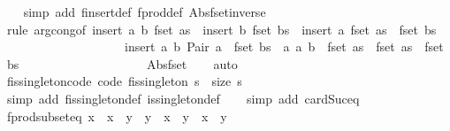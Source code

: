 \begin{isabellebody}
%
\isadelimproof
\ \ %
\endisadelimproof
%
\isatagproof
{}\isamarkupfalse%
\ {\isacharparenleft}simp\ add{\isacharcolon}\ finsert{\isacharunderscore}def\ fprod{\isacharunderscore}def\ Abs{\isacharunderscore}fset{\isacharunderscore}inverse{\isacharparenright}\isanewline
\ \ \isamarkupfalse%
\ {\isacharparenleft}rule\ arg{\isacharunderscore}cong{\isacharbrackleft}of\ {\isachardoublequoteopen}{\isacharparenleft}insert\ {\isacharparenleft}a{\isacharcomma}\ b{\isacharparenright}\ {\isacharparenleft}fset\ as\ {\isasymtimes}\ insert\ b\ {\isacharparenleft}fset\ bs{\isacharparenright}\ {\isasymunion}\ insert\ a\ {\isacharparenleft}fset\ as{\isacharparenright}\ {\isasymtimes}\ fset\ bs{\isacharparenright}{\isacharparenright}{\isachardoublequoteclose}\isanewline
\ \ \ \ \ \ \ \ \ \ \ \ \ \ \ \ \ \ \ \ {\isachardoublequoteopen}{\isacharparenleft}insert\ {\isacharparenleft}a{\isacharcomma}\ b{\isacharparenright}\ {\isacharparenleft}Pair\ a\ {\isacharbackquote}\ fset\ bs\ {\isasymunion}\ {\isacharparenleft}{\isasymlambda}a{\isachardot}\ {\isacharparenleft}a{\isacharcomma}\ b{\isacharparenright}{\isacharparenright}\ {\isacharbackquote}\ fset\ as\ {\isasymunion}\ fset\ as\ {\isasymtimes}\ fset\ bs{\isacharparenright}{\isacharparenright}{\isachardoublequoteclose}\isanewline
\ \ \ \ \ \ \ \ \ \ \ \ \ \ \ \ \ \ \ \ Abs{\isacharunderscore}fset{\isacharbrackright}{\isacharparenright}\isanewline
\ \ \isamarkupfalse%
\ auto%
\endisatagproof
{\isafoldproof}%
%
\isadelimproof
\isanewline
%
\endisadelimproof
\isanewline
{}\isamarkupfalse%
\ fis{\isacharunderscore}singleton{\isacharunderscore}code\ {\isacharbrackleft}code{\isacharbrackright}{\isacharcolon}\ {\isachardoublequoteopen}fis{\isacharunderscore}singleton\ s\ {\isacharequal}\ {\isacharparenleft}size\ s\ {\isacharequal}\ {}{\isacharparenright}{\isachardoublequoteclose}\isanewline
%
\isadelimproof
\ \ %
\endisadelimproof
%
\isatagproof
{}\isamarkupfalse%
\ {\isacharparenleft}simp\ add{\isacharcolon}\ fis{\isacharunderscore}singleton{\isacharunderscore}def\ is{\isacharunderscore}singleton{\isacharunderscore}def{\isacharparenright}\isanewline
\ \ \isamarkupfalse%
\ {\isacharparenleft}simp\ add{\isacharcolon}\ card{\isacharunderscore}Suc{\isacharunderscore}eq{\isacharparenright}%
\endisatagproof
{\isafoldproof}%
%
\isadelimproof
\isanewline
%
\endisadelimproof
\isanewline
{}\isamarkupfalse%
\ fprod{\isacharunderscore}subseteq{\isacharcolon}\ {\isachardoublequoteopen}x\ {\isacharbar}{\isasymsubseteq}{\isacharbar}\ x{\isacharprime}\ {\isasymand}\ y\ {\isacharbar}{\isasymsubseteq}{\isacharbar}\ y{\isacharprime}\ {\isasymLongrightarrow}\ x\ {\isacharbar}{\isasymtimes}{\isacharbar}\ y\ {\isacharbar}{\isasymsubseteq}{\isacharbar}\ x{\isacharprime}\ {\isacharbar}{\isasymtimes}{\isacharbar}\ y{\isacharprime}{\isachardoublequoteclose}\isanewline

\end{isabellebody}
